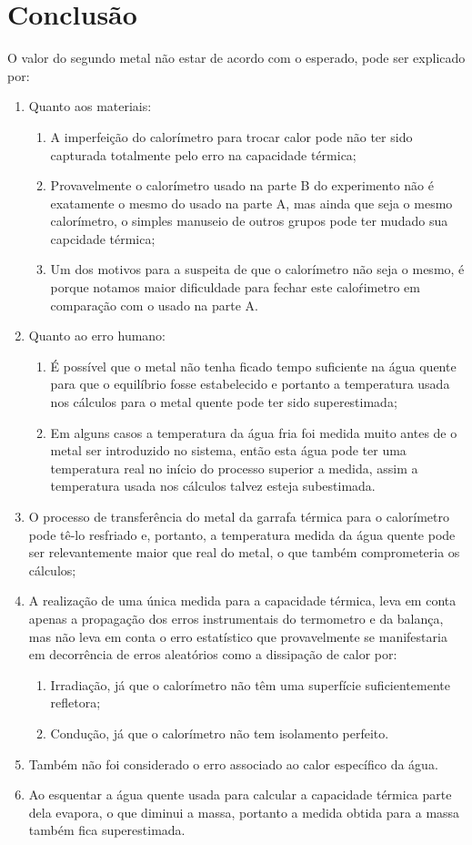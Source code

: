 \documentclass[a4paper]{article}
\begin{document}
			
	\section{Conclusão}
	
		O valor do segundo metal não estar de acordo com o esperado, pode ser explicado por:
		\begin{enumerate}
			\item Quanto aos materiais:
				\begin{enumerate}
					\item A imperfeição do calorímetro para trocar calor pode não ter sido capturada totalmente pelo erro na capacidade térmica; 
					\item Provavelmente o calorímetro usado na parte B do experimento não é exatamente o mesmo do usado na parte A, mas ainda que seja o mesmo calorímetro, o simples manuseio de outros grupos pode ter mudado sua capcidade térmica;
					\item Um dos motivos para a suspeita de que o calorímetro não seja o mesmo, é porque notamos maior dificuldade para fechar este caloŕimetro em comparação com o usado na parte A.
				\end{enumerate}
			\item Quanto ao erro humano:
				\begin{enumerate}
					\item É possível que o metal não tenha ficado tempo suficiente na água quente para que o equilíbrio fosse estabelecido e portanto a temperatura usada nos cálculos para o metal quente pode ter sido superestimada;
					\item Em alguns casos a temperatura da água fria foi medida muito antes de o metal ser introduzido no sistema, então esta água pode ter uma temperatura real no início do processo superior a medida, assim a temperatura usada nos cálculos talvez esteja subestimada.
				\end{enumerate}
			\item O processo de transferência do metal da garrafa térmica para o calorímetro pode tê-lo resfriado e, portanto, a temperatura medida da água quente pode ser relevantemente maior que real do metal, o que também comprometeria os cálculos;
			\item A realização de uma única medida para a capacidade térmica, leva em conta apenas a propagação dos erros instrumentais do termometro e da balança, mas não leva em conta o erro estatístico que provavelmente se manifestaria em decorrência de erros aleatórios como a dissipação de calor por:
				\begin{enumerate}
					\item Irradiação, já que o calorímetro não têm uma superfície suficientemente refletora;
					\item Condução, já que o calorímetro não tem isolamento perfeito.
				\end{enumerate}
			\item Também não foi considerado o erro associado ao calor específico da água.
			\item Ao esquentar a água quente usada para calcular a capacidade térmica parte dela evapora, o que diminui a massa, portanto a medida obtida para a massa também fica superestimada.
		\end{enumerate}
\end{document}
